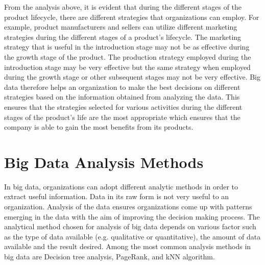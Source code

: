 \documentclass[sigconf]{acmart}
\begin{document}
From the analysis above, it is evident that during the different stages of the product lifecycle, there are different strategies that organizations can employ. For example, product manufacturers and sellers can utilize different marketing strategies during the different stages of a product’s lifecycle. The marketing strategy that is useful in the introduction stage may not be as effective during the growth stage of the product. The production strategy employed during the introduction stage may be very effective but the same strategy when employed during the growth stage or other subsequent stages may not be very effective. Big data therefore helps an organization to make the best decisions on different strategies based on the information obtained from analyzing the data. This ensures that the strategies selected for various activities during the different stages of the product’s life are the most appropriate which ensures that the company is able to gain the most benefits from its products. 
\section{Big Data Analysis Methods}
In big data, organizations can adopt different analytic methods in order to extract useful information. Data in its raw form is not very useful to an organization. Analysis of the data ensures organizations come up with patterns emerging in the data with the aim of improving the decision making process. The analytical method chosen for analysis of big data depends on various factor such as the type of data available (e.g. qualitative or quantitative), the amount of data available and the result desired. Among the most common analysis methods in big data are Decision tree analysis, PageRank, and kNN algorithm.
\end{document}
